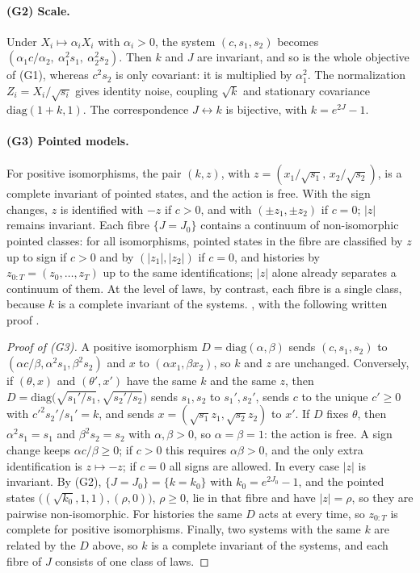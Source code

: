 \paragraph{(G2) Scale.} Under $X_i\mapsto\alpha_iX_i$ with $\alpha_i>0$, the system $(c,s_1,s_2)$ becomes $(\alpha_1c/\alpha_2,\ \alpha_1^2s_1,\ \alpha_2^2s_2)$. Then $k$ and $J$ are invariant, and so is the whole objective of (G1), whereas $c^2s_2$ is only covariant: it is multiplied by $\alpha_1^2$. The normalization $Z_i=X_i/\sqrt{s_i}$ gives identity noise, coupling $\sqrt k$ and stationary covariance $\mathrm{diag}(1+k,1)$. The correspondence $J\leftrightarrow k$ is bijective, with $k=e^{2J}-1$. \stS

\paragraph{(G3) Pointed models.} For positive isomorphisms, the pair $(k,z)$, with $z=(x_1/\sqrt{s_1},\,x_2/\sqrt{s_2})$, is a complete invariant of pointed states, and the action is free. With the sign changes, $z$ is identified with $-z$ if $c>0$, and with $(\pm z_1,\pm z_2)$ if $c=0$; $|z|$ remains invariant. Each fibre $\{J=J_0\}$ contains a continuum of non-isomorphic pointed classes: for all isomorphisms, pointed states in the fibre are classified by $z$ up to sign if $c>0$ and by $(|z_1|,|z_2|)$ if $c=0$, and histories by $z_{0:T}=(z_0,\dots,z_T)$ up to the same identifications; $|z|$ alone already separates a continuum of them. At the level of laws, by contrast, each fibre is a single class, because $k$ is a complete invariant of the systems. \stS, with the following written proof \stA.
\begin{proof}[Proof of (G3)]
A positive isomorphism $D=\mathrm{diag}(\alpha,\beta)$ sends $(c,s_1,s_2)$ to $(\alpha c/\beta,\alpha^2s_1,\beta^2s_2)$ and $x$ to $(\alpha x_1,\beta x_2)$, so $k$ and $z$ are unchanged. Conversely, if $(\theta,x)$ and $(\theta',x')$ have the same $k$ and the same $z$, then $D=\mathrm{diag}\bigl(\sqrt{s_1'/s_1},\sqrt{s_2'/s_2}\bigr)$ sends $s_1,s_2$ to $s_1',s_2'$, sends $c$ to the unique $c'\ge0$ with $c'^2s_2'/s_1'=k$, and sends $x=(\sqrt{s_1}z_1,\sqrt{s_2}z_2)$ to $x'$. If $D$ fixes $\theta$, then $\alpha^2s_1=s_1$ and $\beta^2s_2=s_2$ with $\alpha,\beta>0$, so $\alpha=\beta=1$: the action is free. A sign change keeps $\alpha c/\beta\ge0$; if $c>0$ this requires $\alpha\beta>0$, and the only extra identification is $z\mapsto-z$; if $c=0$ all signs are allowed. In every case $|z|$ is invariant. By (G2), $\{J=J_0\}=\{k=k_0\}$ with $k_0=e^{2J_0}-1$, and the pointed states $\bigl((\sqrt{k_0},1,1),(\rho,0)\bigr)$, $\rho\ge0$, lie in that fibre and have $|z|=\rho$, so they are pairwise non-isomorphic. For histories the same $D$ acts at every time, so $z_{0:T}$ is complete for positive isomorphisms. Finally, two systems with the same $k$ are related by the $D$ above, so $k$ is a complete invariant of the systems, and each fibre of $J$ consists of one class of laws.
\end{proof}

